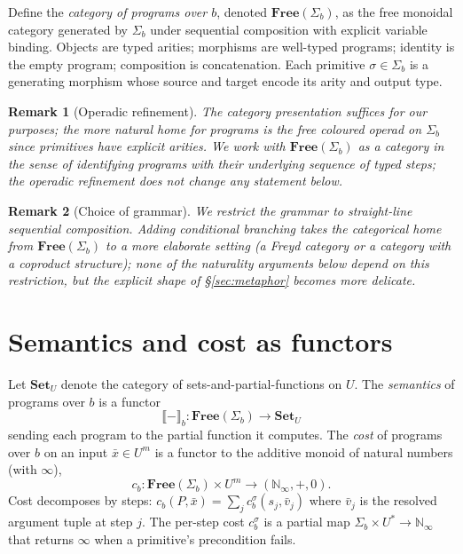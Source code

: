 \documentclass[11pt]{article}
\newtheorem{remark}{Remark}
\begin{document}
Define the \emph{category of programs over $b$}, denoted
$\mathbf{Free}(\Sigma_b)$, as the free monoidal category generated by
$\Sigma_b$ under sequential composition with explicit variable
binding. Objects are typed arities; morphisms are well-typed programs;
identity is the empty program; composition is concatenation. Each
primitive $\sigma \in \Sigma_b$ is a generating morphism whose source
and target encode its arity and output type.

\begin{remark}[Operadic refinement]
The category presentation suffices for our purposes; the more natural
home for programs is the free coloured operad on $\Sigma_b$ since
primitives have explicit arities. We work with $\mathbf{Free}(\Sigma_b)$
as a category in the sense of identifying programs with their
underlying sequence of typed steps; the operadic refinement does not
change any statement below.
\end{remark}

\begin{remark}[Choice of grammar]
We restrict the grammar to straight-line sequential composition.
Adding conditional branching takes the categorical home from
$\mathbf{Free}(\Sigma_b)$ to a more elaborate setting (a Freyd category
or a category with a coproduct structure); none of the naturality
arguments below depend on this restriction, but the explicit shape of
\S\ref{sec:metaphor} becomes more delicate.
\end{remark}

\section{Semantics and cost as functors}

Let $\mathbf{Set}_U$ denote the category of sets-and-partial-functions
on $U$. The \emph{semantics} of programs over $b$ is a functor
\[
\llbracket - \rrbracket_b : \mathbf{Free}(\Sigma_b) \longrightarrow
\mathbf{Set}_U
\]
sending each program to the partial function it computes. The
\emph{cost} of programs over $b$ on an input $\bar{x} \in U^m$ is a
functor to the additive monoid of natural numbers (with $\infty$),
\[
c_b : \mathbf{Free}(\Sigma_b) \times U^m \longrightarrow
(\mathbb{N}_\infty, +, 0).
\]
Cost decomposes by steps: $c_b(P, \bar{x}) = \sum_j c_b^\sigma(s_j,
\bar{v}_j)$ where $\bar{v}_j$ is the resolved argument tuple at step
$j$. The per-step cost $c_b^\sigma$ is a partial map
$\Sigma_b \times U^* \to \mathbb{N}_\infty$ that returns $\infty$ when
a primitive's precondition fails.
\end{document}
